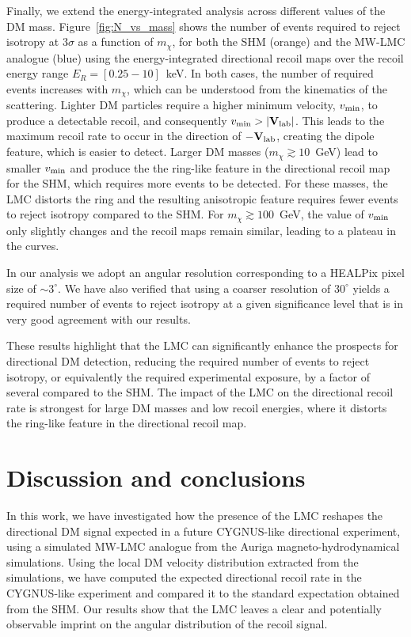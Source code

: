 \documentclass[a4paper,11pt]{article}
\begin{document}
Finally, we extend the energy-integrated analysis across different values of the DM mass. Figure~\ref{fig:N_vs_mass} shows the number of events required to reject isotropy at $3\sigma$ as a function of $m_{\chi}$, for both the SHM (orange) and the MW-LMC analogue (blue) using the energy-integrated directional recoil maps over the recoil energy range $E_R=[0.25-10]$~keV. In both cases, the number of required events increases with $m_{\chi}$, which can be understood from the kinematics of the scattering. Lighter DM particles require a higher minimum velocity, $v_{\rm{min}}$, to produce a detectable recoil, and consequently $v_{\rm min}>|{\bf V}_{\rm lab}|$. This leads to the maximum recoil rate to occur in the direction of $-{\bf V}_{\rm lab}$, creating the dipole feature, which is easier to detect. Larger DM masses ($m_\chi \gtrsim 10$~GeV) lead to smaller $v_{\rm{min}}$ and produce the the ring-like feature in the directional recoil map for the SHM, which requires more events to be detected. For these masses, the LMC distorts the ring and the resulting anisotropic feature requires fewer events to reject isotropy compared to the SHM. For $m_\chi \gtrsim 100$~GeV, the value of $v_{\rm min}$ only slightly changes and the recoil maps remain similar, leading to a plateau in the curves. 

In our analysis we adopt an  angular  resolution corresponding to a HEALPix pixel size of $\sim 3^\circ$. We have also verified that using a coarser resolution of $30^\circ$ yields a required number of events to reject isotropy at a given significance level that is in very good agreement with our results.


These results highlight that the LMC can significantly enhance the prospects for  directional DM detection, reducing the required number of events  to reject isotropy, or equivalently the required experimental exposure, by a factor of several compared to the SHM. The impact of the LMC on the directional recoil rate is strongest for large DM masses and low recoil energies, where it distorts the ring-like feature in the directional recoil map.



\section{Discussion and conclusions}
\label{sec:summary}


In this work, we have investigated how the presence of the LMC reshapes the directional DM signal expected in a future CYGNUS-like directional experiment, using a simulated
MW-LMC analogue from the Auriga magneto-hydrodynamical simulations. Using the local DM velocity distribution extracted from the simulations, we have computed the expected directional recoil rate in the CYGNUS-like experiment and compared it to the standard expectation obtained from the SHM. Our results show that the LMC leaves a clear and potentially observable imprint on the angular distribution of the recoil signal.
\end{document}
